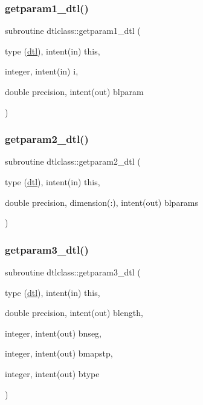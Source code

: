 \mbox{\label{namespacedtlclass_abd0fd1a590b8e198a5b7081e105f11e8}} 
\subsubsection{\texorpdfstring{getparam1\_dtl()}{getparam1\_dtl()}}
{\footnotesize\ttfamily subroutine dtlclass\+::getparam1\+\_\+dtl (\begin{DoxyParamCaption}\item[{type (\mbox{\hyperlink{namespacedtlclass_structdtlclass_1_1dtl}{dtl}}), intent(in)}]{this,  }\item[{integer, intent(in)}]{i,  }\item[{double precision, intent(out)}]{blparam }\end{DoxyParamCaption})}

\mbox{\label{namespacedtlclass_aac10b9bb174a986cd15c1f0a11369c57}} 
\subsubsection{\texorpdfstring{getparam2\_dtl()}{getparam2\_dtl()}}
{\footnotesize\ttfamily subroutine dtlclass\+::getparam2\+\_\+dtl (\begin{DoxyParamCaption}\item[{type (\mbox{\hyperlink{namespacedtlclass_structdtlclass_1_1dtl}{dtl}}), intent(in)}]{this,  }\item[{double precision, dimension(\+:), intent(out)}]{blparams }\end{DoxyParamCaption})}

\mbox{\label{namespacedtlclass_adb7337b9d81c5d4fef24ba72ad107cbe}} 
\subsubsection{\texorpdfstring{getparam3\_dtl()}{getparam3\_dtl()}}
{\footnotesize\ttfamily subroutine dtlclass\+::getparam3\+\_\+dtl (\begin{DoxyParamCaption}\item[{type (\mbox{\hyperlink{namespacedtlclass_structdtlclass_1_1dtl}{dtl}}), intent(in)}]{this,  }\item[{double precision, intent(out)}]{blength,  }\item[{integer, intent(out)}]{bnseg,  }\item[{integer, intent(out)}]{bmapstp,  }\item[{integer, intent(out)}]{btype }\end{DoxyParamCaption})}

